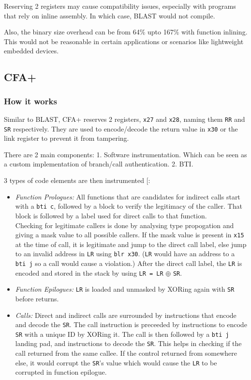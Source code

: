 \documentclass[a4paper, nobind]{templates/ociamthesis}
\providecommand{\tightlist}{%
  \setlength{\itemsep}{0pt}\setlength{\parskip}{0pt}}
\begin{document}
Reserving 2 registers may cause compatibility issues, especially with programs
that rely on inline assembly. In which case, BLAST would not compile.

Also, the binary size overhead can be from 64\% upto 167\% with function inlining.
This would not be reasonable in certain applications or scenarios like lightweight embedded devices.

\subsection{CFA+}\label{cfa-1}

\subsubsection{How it works}\label{how-it-works-1}

Similar to BLAST, CFA+ reserves 2 registers, \texttt{x27} and \texttt{x28}, naming them
\texttt{RR} and \texttt{SR} respectively. They are used to encode/decode the return value in
\texttt{x30} or the link register to prevent it from tampering.

There are 2 main components: 1. Software instrumentation. Which can be seen as
a custom implementation of branch/call authentication. 2. BTI.

3 types of code elements are then instrumented {[}\citeproc{ref-cfaplus}{4}{]}:

\begin{itemize}
\tightlist
\item
  \emph{Function Prologues:}
  All functions that are candidates for indirect calls start
  with a \texttt{bti\ c}, followed by a block to verify the legitimacy of the caller.
  That block is followed by a label used for direct calls to that function.\\
  Checking for legitimate callers is done by analysing type propogation and giving
  a mask value to all possible callers. If the mask value is present in \texttt{x15} at
  the time of call, it is legitimate and jump to the direct call label,
  else jump to an invalid address in \texttt{LR} using \texttt{blr\ x30}.
  (\texttt{LR} would have an address to a \texttt{bti\ j} so a call would cause a violation.)
  After the direct call label, the \texttt{LR} is encoded and stored in the stack by using
  \texttt{LR\ =\ LR} \(\oplus\) \texttt{SR}.
\item
  \emph{Function Epilogues:}
  \texttt{LR} is loaded and unmasked by XORing again with \texttt{SR} before returns.
\item
  \emph{Calls:}
  Direct and indirect calls are surrounded by instructions that encode and decode the \texttt{SR}.
  The call instruction is preceeded by instructions to encode \texttt{SR} with a unique ID by XORing it.
  The call is then followed by a \texttt{bti\ j} landing pad, and instructions to decode the \texttt{SR}.
  This helps in checking if the call returned from the same callee.
  If the control returned from somewhere else, it would corrupt the
  \texttt{SR}'s value which would cause the \texttt{LR} to be corrupted in function epilogue.
\end{itemize}
\end{document}
